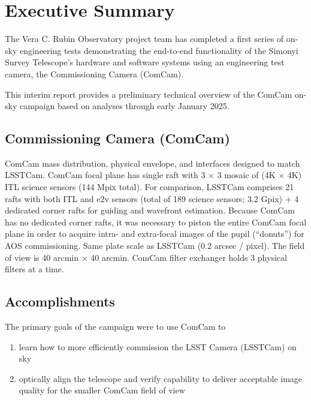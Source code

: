 \section{Executive Summary}
\label{sec:summary}

The Vera C. Rubin Observatory project team has completed a first series of on-sky engineering tests demonstrating the end-to-end functionality of the Simonyi Survey Telescope's hardware and software systems using an engineering test camera, the Commissioning Camera (ComCam).

\begin{note}
    This interim report provides a preliminary technical overview of the ComCam on-sky campaign based on analyses through early January 2025.
\end{note}

\emph{}

\subsection{Commissioning Camera (ComCam)}

ComCam mass distribution, physical envelope, and interfaces designed to match LSSTCam.
ComCam focal plane has single raft with 3 $\times$ 3 mosaic of (4K $\times$ 4K) ITL science sensors (144 Mpix total).
For comparison, LSSTCam comprises 21 rafts with both ITL and e2v sensors (total of 189 science sensors; 3.2 Gpix) + 4 dedicated corner rafts for guiding and wavefront estimation.
Because ComCam has no dedicated corner rafts, it was necessary to piston the entire ComCam focal plane in
order to acquire intra- and extra-focal images of the pupil (``donuts'') for AOS commissioning.
Same plate scale as LSSTCam (0.2 arcsec / pixel).
The field of view is 40 arcmin $\times$ 40 arcmin.
ComCam filter exchanger holds 3 physical filters at a time.

\subsection{Accomplishments}

The primary goals of the campaign were to use ComCam to

\begin{enumerate}
    \item learn how to more efficiently commission the LSST Camera (LSSTCam) on sky
    \item optically align the telescope and verify capability to deliver acceptable image quality for the smaller ComCam field of view
\end{enumerate}

